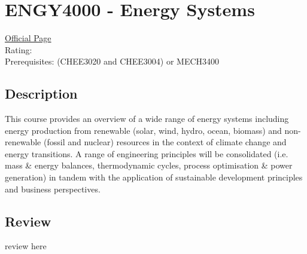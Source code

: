 \hypertarget{ENGY4000}{\section{ENGY4000 - Energy Systems}}

\large
\textcolor{turbo_purple}{\href{https://my.uq.edu.au/programs-courses/course.html?course_code=ENGY4000}{Official Page}} \\
Rating: \cstar\cstar\cstar\cstar\ostar \\
Prerequisites: (CHEE3020 and CHEE3004) or MECH3400

\normalsize
\subsection*{Description}
This course provides an overview of a wide range of energy systems including energy production from renewable (solar, wind, hydro, ocean, biomass) and non-renewable (fossil and nuclear) resources in the context of climate change and energy transitions.
A range of engineering principles will be consolidated (i.e. mass \& energy balances, thermodynamic cycles, process optimisation \& power generation) in tandem with the application of sustainable development principles and business perspectives.

\subsection*{Review}
review here
